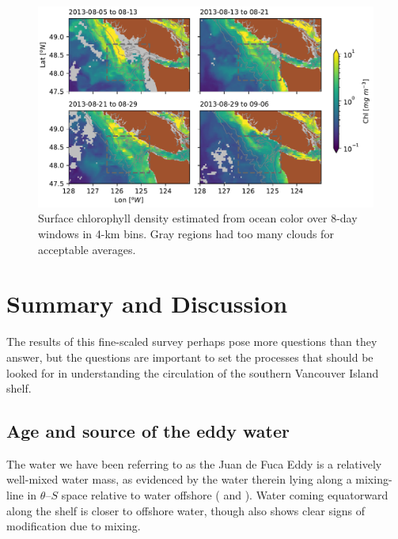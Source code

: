\documentclass[draft]{agujournal2019}
\begin{document}
\begin{figure}[htbp]
  \begin{center}
    \includegraphics[width=6.2in]{ChlA}
    \caption{Surface chlorophyll density estimated from ocean color \cite{Huetal12,MODISChlL3} over 8-day windows in 4-km bins. Gray regions had too many clouds for acceptable averages.
      \label{fig:ChlA} }
  \end{center}
\end{figure}


\section{Summary and Discussion}
\label{sec:Summary}

The results of this fine-scaled survey perhaps pose more questions than they answer, but the questions are important to set the processes that should be looked for in understanding the circulation of the southern Vancouver Island shelf.

\subsection{Age and source of the eddy water}

The water we have been referring to as the Juan de Fuca Eddy is a relatively well-mixed water mass, as evidenced by the water therein lying along a mixing-line in $\theta$--$S$ space relative to water offshore ( and ).  Water coming equatorward along the shelf is closer to offshore water, though also shows clear signs of modification due to mixing.
\end{document}
